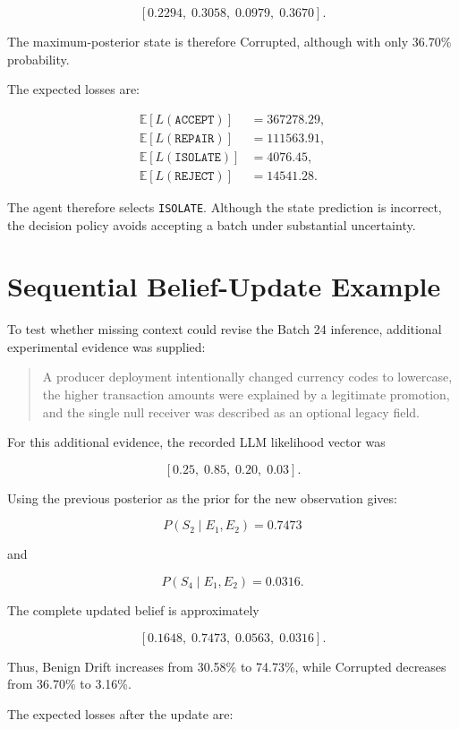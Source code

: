 \documentclass{article}
\begin{document}
\[
[0.2294,\;0.3058,\;0.0979,\;0.3670].
\]

The maximum-posterior state is therefore Corrupted, although with only 36.70\% probability.

The expected losses are:

\begin{align*}
\mathbb{E}[L(\texttt{ACCEPT})] &= 367278.29,\\
\mathbb{E}[L(\texttt{REPAIR})] &= 111563.91,\\
\mathbb{E}[L(\texttt{ISOLATE})] &= 4076.45,\\
\mathbb{E}[L(\texttt{REJECT})] &= 14541.28.
\end{align*}

The agent therefore selects \texttt{ISOLATE}. Although the state prediction is incorrect, the decision policy avoids accepting a batch under substantial uncertainty.


\section{Sequential Belief-Update Example}

To test whether missing context could revise the Batch 24 inference, additional experimental evidence was supplied:

\begin{quote}
A producer deployment intentionally changed currency codes to lowercase, the higher transaction amounts were explained by a legitimate promotion, and the single null receiver was described as an optional legacy field.
\end{quote}

For this additional evidence, the recorded LLM likelihood vector was

\[
[0.25,\;0.85,\;0.20,\;0.03].
\]

Using the previous posterior as the prior for the new observation gives:

\[
P(S_2\mid E_1,E_2)=0.7473
\]

and

\[
P(S_4\mid E_1,E_2)=0.0316.
\]

The complete updated belief is approximately

\[
[0.1648,\;0.7473,\;0.0563,\;0.0316].
\]

Thus, Benign Drift increases from 30.58\% to 74.73\%, while Corrupted decreases from 36.70\% to 3.16\%.

The expected losses after the update are:
\end{document}
